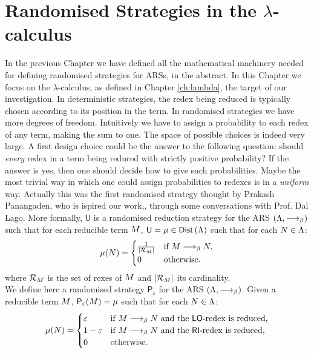 \chapter{Randomised Strategies in the $\lambda$-calculus}
In the previous Chapter we have defined all the mathematical machinery needed for defining randomised strategies for ARSs, in the abstract. In this Chapter we focus on the $\lambda$-calculus, as defined in Chapter \ref{ch:lambda}, the target of our investigation. In deterministic strategies, the redex being reduced is typically chosen according to its position in the term. In randomised strategies we have more degrees of freedom. Intuitively we have to assign a probability to each redex of any term, making the sum to one. The space of possible choices is indeed very large. A first design choice could be the answer to the following question: should \emph{every} redex in a term being reduced with strictly positive probability? If the answer is yes, then one should decide how to give such probabilities. Maybe the most trivial way in which one could assign probabilities to redexes is in a \emph{uniform} way. Actually this was the first randomised strategy thought by Prakash Panangaden, who is ispired our work,, through some conversations with Prof. Dal Lago. More formally, $\mathsf{U}$ is a randomised reduction strategy for the ARS $(\Lambda,\longrightarrow_\beta)$ such that for each reducible term $M$, $\mathsf{U}=\mu\in\textsf{Dist}\left(\Lambda\right)$ such that for each $N\in\Lambda$:
$$
\mu(N)=\begin{cases}
\frac{1}{|\mathcal{R}_{M}|} & \text{if }M\longrightarrow_\beta N ,\\
0 & \text{otherwise}.\\
\end{cases}
$$
where $\mathcal{R}_{M}$ is the set of rexes of $M$ and $|\mathcal{R}_{M}|$ its cardinality.\\
We define here a randomised strategy $\mathsf{P}_\varepsilon$ for the ARS $(\Lambda,\longrightarrow_\beta)$. Given a reducible term $M$, $\mathsf{P}_\varepsilon(M)=\mu$ such that for each $N\in\Lambda$:
$$
\mu(N)=\begin{cases}
\varepsilon & \text{if }M\longrightarrow_\beta N\text{ and the }\textsf{LO}\text{-redex is reduced,}\\
1-\varepsilon & \text{if }M\longrightarrow_\beta N\text{ and the }\textsf{RI}\text{-redex is reduced,}\\
0 & \text{otherwise}.\\
\end{cases}
$$
